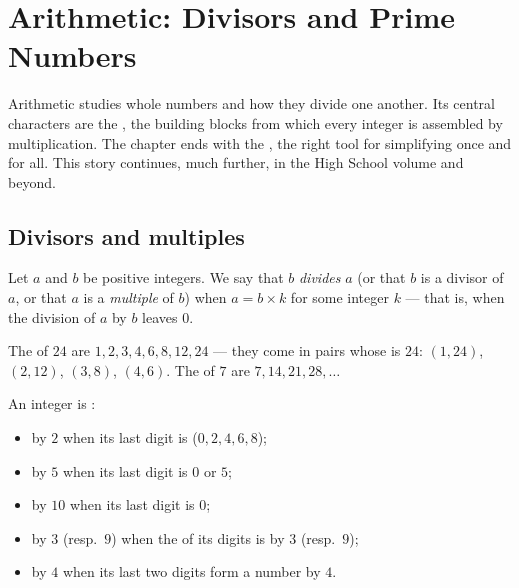 \chapter{Arithmetic: Divisors and Prime Numbers}\label{ch:g9:arith}

Arithmetic studies whole numbers and how they divide one another. Its
central characters are the , the building blocks from which
every integer is assembled by multiplication. The chapter ends with the
, the right tool for simplifying  once
and for all. This story continues, much further, in the High School
volume and beyond.

\section{Divisors and multiples}

\begin{definition}\label{def:g9:arith:divisor}
Let $a$ and $b$ be positive integers. We say that $b$
\emph{divides} $a$ (or that $b$ is a divisor of $a$, or
that $a$ is a \emph{multiple} of $b$) when $a = b \times
k$ for some integer $k$ --- that is, when the division of $a$ by $b$
leaves  $0$.
\end{definition}

\begin{example}
The  of $24$ are $1, 2, 3, 4, 6, 8, 12, 24$ --- they come in
pairs whose  is $24$: $(1,24)$, $(2,12)$, $(3,8)$, $(4,6)$. The
 of $7$ are $7, 14, 21, 28, \dots$
\end{example}

\begin{proposition}\label{prop:g9:arith:rules}
An integer is :
\begin{itemize}
  \item by $2$ when its last digit is  ($0, 2, 4, 6, 8$);
  \item by $5$ when its last digit is $0$ or $5$;
  \item by $10$ when its last digit is $0$;
  \item by $3$ (resp.\ $9$) when the  of its digits is  by
        $3$ (resp.\ $9$);
  \item by $4$ when its last two digits form a number  by $4$.
\end{itemize}
\end{proposition}
\admitted

